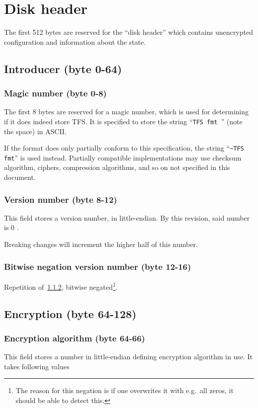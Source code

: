 \documentclass[11pt,a4paper]{report}
\newcommand{\clustersize}{512 }
\newcommand{\versionnumber}{0 }
\begin{document}
    \chapter{Disk header}
    The first \clustersize bytes are reserved for the ``disk header'' which
    contains unencrypted configuration and information about the state.

    \section{Introducer (byte 0-64)}
        \subsection{Magic number (byte 0-8)}
        The first 8 bytes are reserved for a magic number, which is used for
        determining if it does indeed store TFS\@. It is specified to store the
        string ``\texttt{TFS fmt }'' (note the space) in ASCII.

        If the format does only partially conform to this specification, the
        string ``\texttt{\textasciitilde TFS fmt}'' is used instead. Partially
        compatible implementations may use checksum algorithm, ciphers,
        compression algorithms, and so on not specified in this document.

        \subsection{Version number (byte 8-12)}
        \label{header:versionnumber}
        This field stores a version number, in little-endian. By this revision,
        said number is \versionnumber.

        Breaking changes will increment the higher half of this number.

        \subsection{Bitwise negation version number (byte 12-16)}
        Repetition of~\ref{header:versionnumber}, bitwise
        negated\footnote{The reason for this negation is if one overwrites it
        with e.g.\ all zeros, it should be able to detect this.}.

    \section{Encryption (byte 64-128)}
        \subsection{Encryption algorithm (byte 64-66)}
        \label{header:encryption}
        This field stores a number in little-endian defining encryption
        algorithm in use. It takes following values
\end{document}
